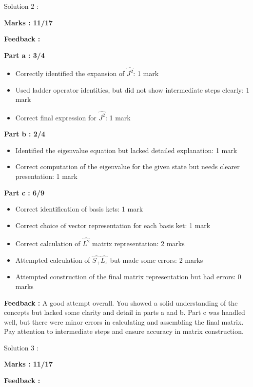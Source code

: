 \documentclass[a4paper,11pt]{article}
\begin{document}
Solution 2 :

\textbf{Marks : 11/17}

\textbf{Feedback : }

\textbf{Part a : 3/4}

\begin{itemize}
    \item Correctly identified the expansion of $\hat{J^2}$: 1 mark
    \item Used ladder operator identities, but did not show intermediate steps clearly: 1 mark
    \item Correct final expression for $\hat{J^2}$: 1 mark
\end{itemize}


\textbf{Part b : 2/4}

\begin{itemize}
    \item Identified the eigenvalue equation but lacked detailed explanation: 1 mark
    \item Correct computation of the eigenvalue for the given state but needs clearer presentation: 1 mark
\end{itemize}


\textbf{Part c : 6/9}

\begin{itemize}
    \item Correct identification of basis kets: 1 mark
    \item Correct choice of vector representation for each basis ket: 1 mark
    \item Correct calculation of $\hat{L^2}$ matrix representation: 2 marks
    \item Attempted calculation of $\hat{S_+}\hat{L_z}$ but made some errors: 2 marks
    \item Attempted construction of the final matrix representation but had errors: 0 marks
\end{itemize}

\textbf{Feedback :}
A good attempt overall. You showed a solid understanding of the concepts but lacked some clarity and detail in parts a and b. Part c was handled well, but there were minor errors in calculating and assembling the final matrix. Pay attention to intermediate steps and ensure accuracy in matrix construction.



Solution 3 :

\textbf{Marks : 11/17}

\textbf{Feedback : }
\end{document}
